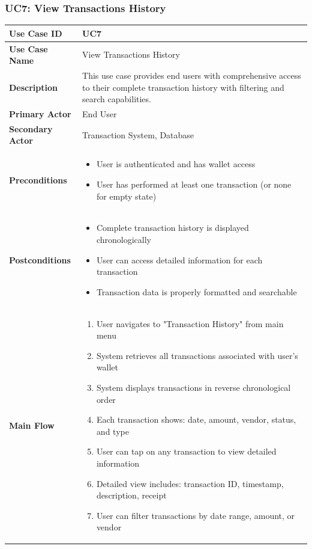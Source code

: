 \subsubsection{UC7: View Transactions History}

\begin{longtable}{|p{3cm}|p{11cm}|}
\hline
\textbf{Use Case ID} & UC7 \\
\hline
\textbf{Use Case Name} & View Transactions History \\
\hline
\textbf{Description} & This use case provides end users with comprehensive access to their complete transaction history with filtering and search capabilities. \\
\hline
\textbf{Primary Actor} & End User \\
\hline
\textbf{Secondary Actor} & Transaction System, Database \\
\hline
\textbf{Preconditions} & 
\begin{itemize}[nosep,leftmargin=*]
\item User is authenticated and has wallet access
\item User has performed at least one transaction (or none for empty state)
\end{itemize} \\
\hline
\textbf{Postconditions} & 
\begin{itemize}[nosep,leftmargin=*]
\item Complete transaction history is displayed chronologically
\item User can access detailed information for each transaction
\item Transaction data is properly formatted and searchable
\end{itemize} \\
\hline
\textbf{Main Flow} & 
\begin{enumerate}[nosep,leftmargin=*]
\item User navigates to "Transaction History" from main menu
\item System retrieves all transactions associated with user's wallet
\item System displays transactions in reverse chronological order
\item Each transaction shows: date, amount, vendor, status, and type
\item User can tap on any transaction to view detailed information
\item Detailed view includes: transaction ID, timestamp, description, receipt
\item User can filter transactions by date range, amount, or vendor

\end{enumerate}
\end{longtable}
